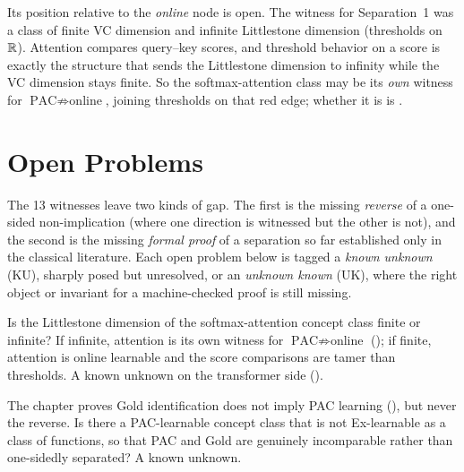 Its position relative to the \emph{online} node is open. The witness for
Separation~1 was a class of finite VC dimension and infinite Littlestone
dimension (thresholds on~$\mathbb{R}$). Attention compares query--key scores, and
threshold behavior on a score is exactly the structure that sends the
Littlestone dimension to infinity while the VC dimension stays finite. So
the softmax-attention class may be its \emph{own} witness for
$\text{PAC} \not\Rightarrow \text{online}$, joining thresholds on that red
edge; whether it is is .



\section{Open Problems}
\label{sec:separations-open}

The 13 witnesses leave two kinds of gap. The first is the missing \emph{reverse}
of a one-sided non-implication (where one direction is witnessed but the
other is not), and the second is the missing \emph{formal proof} of a separation so far
established only in the classical literature. Each open problem below is
tagged a \emph{known unknown} (KU), sharply posed but unresolved, or an
\emph{unknown known} (UK), where the right object or invariant for a
machine-checked proof is still missing.

\begin{openprob}
\label{op:attention-littlestone}
Is the Littlestone dimension of the softmax-attention concept class finite
or infinite?  If infinite, attention is its own witness for
$\text{PAC} \not\Rightarrow \text{online}$
(); if finite, attention is online
learnable and the score comparisons are tamer than thresholds.  A known
unknown on the transformer side ().
\end{openprob}

\begin{openprob}
\label{op:reverse-pac-ex}
The chapter proves Gold identification does not imply PAC learning
(), but never the reverse.  Is there a
PAC-learnable concept class that is not Ex-learnable as a class of
functions, so that PAC and Gold are genuinely incomparable rather than
one-sidedly separated?  A known unknown.
\end{openprob}

